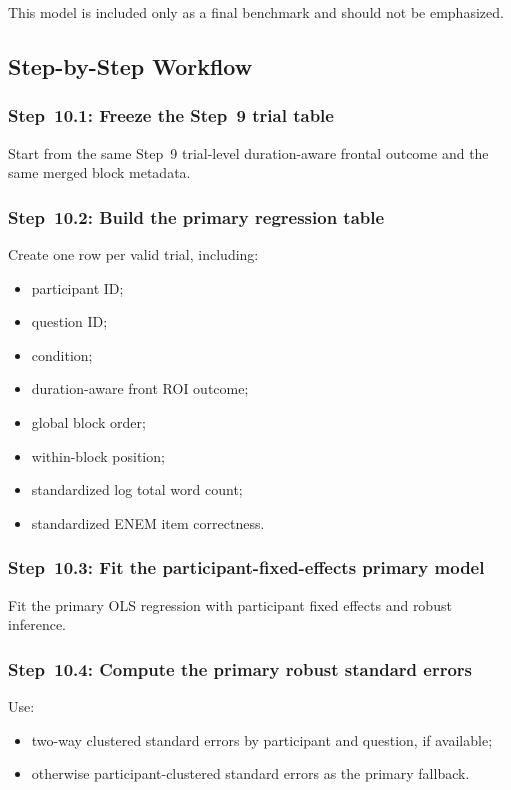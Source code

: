 This model is included only as a final benchmark and should not be emphasized.

\subsection{Step-by-Step Workflow}

\subsubsection{Step~10.1: Freeze the Step~9 trial table}
Start from the same Step~9 trial-level duration-aware frontal outcome and the same merged block metadata.

\subsubsection{Step~10.2: Build the primary regression table}
Create one row per valid trial, including:
\begin{itemize}
    \item participant ID;
    \item question ID;
    \item condition;
    \item duration-aware front ROI outcome;
    \item global block order;
    \item within-block position;
    \item standardized log total word count;
    \item standardized ENEM item correctness.
\end{itemize}

\subsubsection{Step~10.3: Fit the participant-fixed-effects primary model}
Fit the primary OLS regression with participant fixed effects and robust inference.

\subsubsection{Step~10.4: Compute the primary robust standard errors}
Use:
\begin{itemize}
    \item two-way clustered standard errors by participant and question, if available;
    \item otherwise participant-clustered standard errors as the primary fallback.
\end{itemize}

